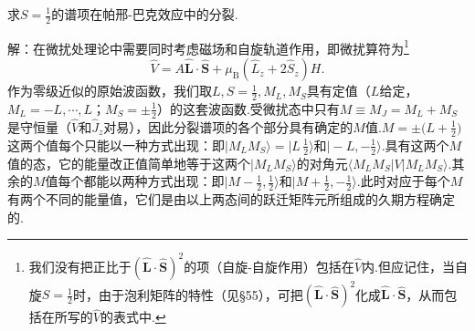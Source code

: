\begin{xiti}

\quad 求$S=\frac{1}{2}$的谱项在帕邢-巴克效应中的分裂.

解：在微扰处理论中需要同时考虑磁场和自旋轨道作用，即微扰算符为\footnote{我们没有把正比于$(\hat{\boldsymbol{L}}\cdot\hat{\boldsymbol{S}})^2$的项（自旋-自旋作用）包括在$\hat{V}$内.但应记住，当自旋$S=\frac{1}{2}$时，由于泡利矩阵的特性（见§55），可把$(\hat{\boldsymbol{L}}\cdot\hat{\boldsymbol{S}})^2$化成$\hat{\boldsymbol{L}}\cdot\hat{\boldsymbol{S}}$，从而包括在所写的$\hat{V}$的表式中.}
\begin{equation*}
  \hat{V}=A\hat{\boldsymbol{L}}\cdot\hat{\boldsymbol{S}}
  +\mu_\mathrm{B}(\hat{L}_z+2\hat{S}_z)H.
\end{equation*}
作为零级近似的原始波函数，我们取$L,S=\frac{1}{2},M_L,M_S$具有定值（$L$给定，$M_L=-L,\cdots,L$；$M_S=\pm\frac{1}{2}$）的这套波函数.受微扰态中只有$M\equiv M_J=M_L+M_S$是守恒量（$\hat{V}$和$\hat{J}_z$对易），因此分裂谱项的各个部分具有确定的$M$值.$M=\pm\bigl(L+\frac{1}{2}\bigr)$这两个值每个只能以一种方式出现：即$|M_LM_S\rangle=\bigl|L\,\frac{1}{2}\bigr\rangle$和$\bigl|-L,-\frac{1}{2}\bigr\rangle$.具有这两个$M$值的态，它的能量改正值简单地等于这两个$|M_LM_S\rangle$的对角元$\langle M_LM_S|V|M_LM_S\rangle$.其余的$M$值每个都能以两种方式出现：即$\bigl|M-\frac{1}{2},\frac{1}{2}\bigr\rangle$和$\bigl|M+\frac{1}{2},-\frac{1}{2}\bigr\rangle$.此时对应于每个$M$有两个不同的能量值，它们是由以上两态间的跃迁矩阵元所组成的久期方程确定的.


\end{xiti}
